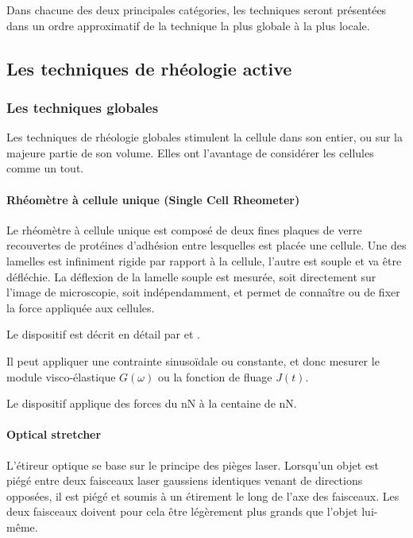 Dans chacune des deux principales catégories, les techniques seront présentées dans un ordre approximatif de la technique la plus globale à la plus locale. 

\subsection{Les techniques de rhéologie active}
\subsubsection{Les techniques globales}
Les techniques de rhéologie globales stimulent la cellule dans son entier, ou sur la majeure partie de son volume. Elles ont l'avantage de considérer les cellules comme un tout. 

\paragraph{Rhéomètre à cellule unique (Single Cell Rheometer)}

Le rhéomètre à cellule unique est composé de deux fines plaques de verre recouvertes de protéines d'adhésion entre lesquelles est placée une cellule. Une des lamelles est infiniment rigide par rapport à la cellule, l'autre est souple et va être défléchie. 
La déflexion de la lamelle souple est mesurée, soit directement sur l'image de microscopie, soit indépendamment, et permet de connaître ou de fixer la force appliquée aux cellules. 

Le dispositif est décrit en détail par \cite{desprat_creep_2005} et \cite{bufi_single-cell_2015}. 




Il peut appliquer une contrainte sinusoïdale ou constante, et donc mesurer le module visco-élastique $G(\omega)$ ou la fonction de fluage $J(t)$. 

Le dispositif applique des forces du nN à la centaine de nN.



\paragraph{Optical stretcher}

L'étireur optique se base sur le principe des pièges laser.
Lorsqu'un objet est piégé entre deux faisceaux laser gaussiens identiques venant de directions opposées, il est piégé et soumis à un étirement le long de l'axe des faisceaux. 
Les deux faisceaux doivent pour cela être légèrement plus grands que l'objet lui-même. 

